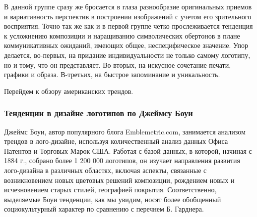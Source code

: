 В данной группе сразу же бросается в глаза разнообразие оригинальных приемов и вариативность
перспектив в построении изображений с учетом его зрительного восприятия. Точно так же как и в первой
группе четко прослеживается тенденция к усложнению композиции и наращиванию символических обертонов
в плане коммуникативных ожиданий, имеющих общее, неспецифическое значение. Упор делается, во-первых,
на придание индивидуальности не только самому логотипу, но и тому, что он представляет. Во-вторых,
на искусное сочетание печати, графики и образа. В-третьих, на быстрое запоминание и уникальность.

Перейдем к обзору американских трендов.

\subsubsection{Тенденции в дизайне логотипов по Джеймсу Боуи}

Джеймс Боуи, автор популярного блога Emblemetric.com, занимается анализом трендов в лого-дизайне,
используя  количественный анализ данных Офиса Патентов и Торговых Марок США. Работая с базой данных,
в которой,  начиная с 1884 г., собрано более 1 200 000 логотипов, он изучает  направления развития
лого-дизайна в различных областях, включая аспекты, связанные с возникновением новых цветовых
решений композиции, рождением новых и исчезновением старых стилей, географией
покрытия. Соответственно, выделяемые Боуи тенденции, как мы увидим, носят более обобщенный
социокультурный характер по сравнению с перечнем Б. Гарднера.

